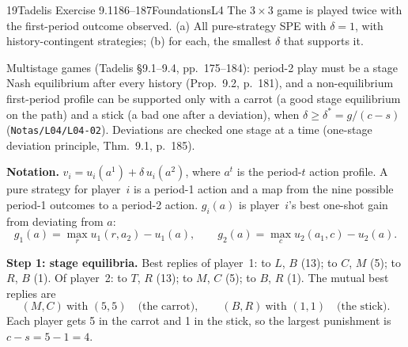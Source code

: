 \begin{exsol}{19}{Tadelis Exercise 9.1}{186--187}{Foundations}{L4}
\asked The $3\times3$ game is played twice with the first-period outcome observed. (a) All
pure-strategy SPE with $\delta = 1$, with history-contingent strategies; (b) for each, the smallest
$\delta$ that supports it.

\method Multistage games (Tadelis \S9.1--9.4, pp.~175--184): period-2 play must be a stage Nash
equilibrium after every history (Prop.~9.2, p.~181), and a non-equilibrium first-period profile
can be supported only with a carrot (a good stage equilibrium on the path) and a stick (a bad one
after a deviation), when $\delta \ge \delta^* = g/(c - s)$ (\texttt{Notas/L04/L04-02}). Deviations
are checked one stage at a time (one-stage deviation principle, Thm.~9.1, p.~185).

\solution
\textbf{Notation.} $v_i = u_i(a^1) + \delta\, u_i(a^2)$, where $a^t$ is the period-$t$ action
profile. A pure strategy for player~$i$ is a period-1 action and a map from the nine possible
period-1 outcomes to a period-2 action. $g_i(a)$ is player~$i$'s best one-shot gain from deviating
from $a$:
\[
  g_1(a) = \max_{r} u_1(r, a_2) - u_1(a), \qquad g_2(a) = \max_{c} u_2(a_1, c) - u_2(a).
\]

\textbf{Step 1: stage equilibria.} Best replies of player~1: to $L$, $B$ (13); to $C$, $M$ (5);
to $R$, $B$ (1). Of player~2: to $T$, $R$ (13); to $M$, $C$ (5); to $B$, $R$ (1). The mutual best
replies are
\[
  (M, C)\ \text{with } (5,5) \quad\text{(the carrot)}, \qquad (B, R)\ \text{with } (1,1)
  \quad\text{(the stick)} .
\]
Each player gets 5 in the carrot and 1 in the stick, so the largest punishment is $c - s = 5 - 1 = 4$.


\end{exsol}
